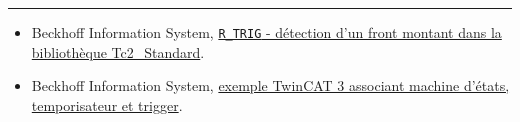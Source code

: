 \vfill
{\color{ekline}\rule{\linewidth}{0.6pt}}\vspace{3mm}
\begin{itemize}\footnotesize\color{ekmuted}
  \item Beckhoff Information System, \href{https://infosys.beckhoff.com/content/1033/tcplclib_tc2_standard/74391563.html}{\texttt{R\_TRIG} - détection d'un front montant dans la bibliothèque Tc2\_Standard}.
  \item Beckhoff Information System, \href{https://infosys.beckhoff.com/content/1033/tc3_plc_intro/7647315979.html}{exemple TwinCAT 3 associant machine d'états, temporisateur et trigger}.
\end{itemize}

\newpage

